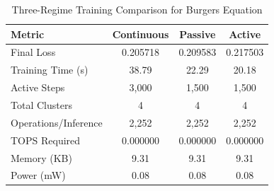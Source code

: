 \begin{table}[htbp]
\centering
\caption{Three-Regime Training Comparison for Burgers Equation}
\label{tab:three_regime_comparison}
\begin{tabular}{l|ccc}
\hline
\textbf{Metric} & \textbf{Continuous} & \textbf{Passive} & \textbf{Active} \\
\hline
Final Loss & 0.205718 & 0.209583 & 0.217503 \\
Training Time (s) & 38.79 & 22.29 & 20.18 \\
Active Steps & 3,000 & 1,500 & 1,500 \\
Total Clusters & 4 & 4 & 4 \\
Operations/Inference & 2,252 & 2,252 & 2,252 \\
TOPS Required & 0.000000 & 0.000000 & 0.000000 \\
Memory (KB) & 9.31 & 9.31 & 9.31 \\
Power (mW) & 0.08 & 0.08 & 0.08 \\
\hline
\end{tabular}
\end{table}
